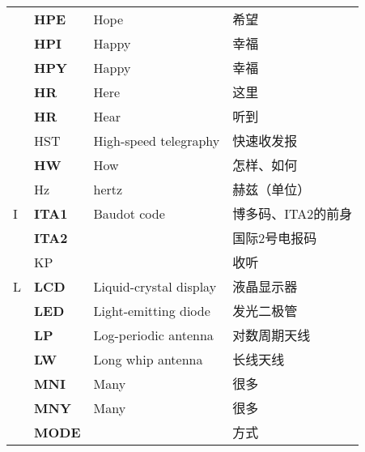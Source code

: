 \begin{longtable}[l]{llll}
    & \textbf{HPE}                      & Hope                                    & 希望                  \\
    & \textbf{HPI}                      & Happy                                   & 幸福                  \\
    & \textbf{HPY}                      & Happy                                   & 幸福                  \\
    & \textbf{HR}                       & Here                                    & 这里                  \\
    & \textbf{HR}                       & Hear                                    & 听到                  \\
    & HST                               & High-speed telegraphy                   & 快速收发报               \\
    & \textbf{HW}                       & How                                     & 怎样、如何               \\
    & Hz                                & hertz                                   & 赫兹（单位）              \\
  I & \textbf{ITA1}                     & Baudot code                             & 博多码、ITA2的前身         \\
    & \textbf{ITA2}                     &                                         & 国际2号电报码             \\
    & KP                                &                                         & 收听                  \\
  L & \textbf{LCD}                      & Liquid-crystal display                  & 液晶显示器               \\
    & \textbf{LED}                      & Light-emitting diode                    & 发光二极管               \\
    & \textbf{LP}                       & Log-periodic antenna                    & 对数周期天线              \\
    & \textbf{LW}                       & Long whip antenna                       & 长线天线                \\
    & \textbf{MNI}                      & Many                                    & 很多                  \\
    & \textbf{MNY}                      & Many                                    & 很多                  \\
    & \textbf{MODE}                     &                                         & 方式                  \\

\end{longtable}
